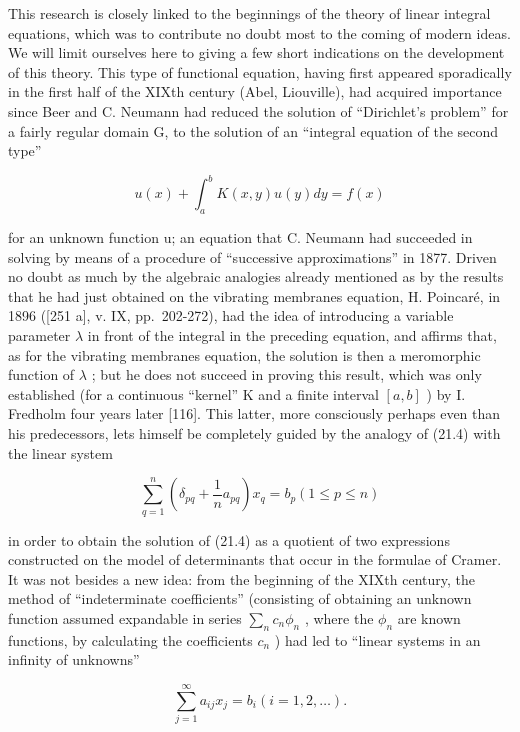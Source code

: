 This research is closely linked to the beginnings of the theory of linear integral equations, which was to contribute no doubt most to the coming of modern ideas. We will limit ourselves here to giving a few short indications on the development of this theory. This type of functional equation, having first appeared sporadically in the first half of the XIXth century (Abel, Liouville), had acquired importance since Beer and C. Neumann had reduced the solution of ``Dirichlet's problem'' for a fairly regular domain G, to the solution of an ``integral equation of the second type''

\[
u (x) + \int_ {a} ^ {b} K (x, y) u (y) d y = f (x)\tag{21.4}
\]

for an unknown function u; an equation that C. Neumann had succeeded in solving by means of a procedure of ``successive approximations'' in 1877. Driven no doubt as much by the algebraic analogies already mentioned as by the results that he had just obtained on the vibrating membranes equation, H. Poincaré, in 1896 ({[}251 a{]}, v. IX, pp.~202-272), had the idea of introducing a variable parameter \(\lambda\) in front of the integral in the preceding equation, and affirms that, as for the vibrating membranes equation, the solution is then a meromorphic function of \(\lambda\) ; but he does not succeed in proving this result, which was only established (for a continuous ``kernel'' K and a finite interval \([a, b]\) ) by I. Fredholm four years later {[}116{]}. This latter, more consciously perhaps even than his predecessors, lets himself be completely guided by the analogy of (21.4) with the linear system

\[
\sum_ {q = 1} ^ {n} \left(\delta_ {p q} + \frac {1}{n} a _ {p q}\right) x _ {q} = b _ {p} (1 \leq p \leq n)\tag{21.5}
\]

in order to obtain the solution of (21.4) as a quotient of two expressions constructed on the model of determinants that occur in the formulae of Cramer. It was not besides a new idea: from the beginning of the XIXth century, the method of ``indeterminate coefficients'' (consisting of obtaining an unknown function assumed expandable in series \(\sum_{n} c_{n} \phi_{n}\) , where the \(\phi_{n}\) are known functions, by calculating the coefficients \(c_{n}\) ) had led to ``linear systems in an infinity of unknowns''

\[
\sum_ {j = 1} ^ {\infty} a _ {i j} x _ {j} = b _ {i} (i = 1, 2, \dots).\tag{21.6}
\]

